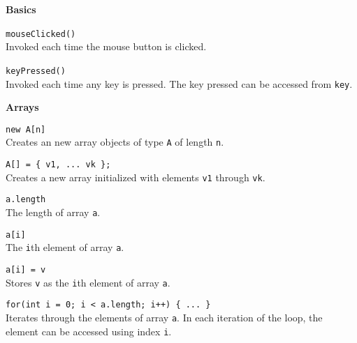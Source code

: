 \documentclass[10pt,twocolumn]{article}
\begin{document}
\thispagestyle{empty}


\noindent\textbf{\large Basics}

\begin{description}
\item{\texttt{mouseClicked()}}\ \\[.25em]
Invoked each time the mouse button is clicked.

\item{\texttt{keyPressed()}}\ \\[.25em] 
Invoked each time any key is pressed. The key pressed can be accessed
from \texttt{key}.
\end{description}

\bigskip

\noindent\textbf{\large Arrays}

\begin{description}
\item{\texttt{new A[n]}} \\[.25em]
Creates an new array objects of type \texttt{A} of length
\texttt{n}. 

\item{\texttt{A[] = \{ v1, ... vk \};}} \\[.25em] 
Creates a new array initialized with elements \texttt{v1} through \texttt{vk}. 


\item{\texttt{a.length}} \\[.25em]
The length of array \texttt{a}. 

\item{\texttt{a[i]}} \\[.25em]
The \texttt{i}th element of array \texttt{a}. 

\item{\texttt{a[i] = v}} \\[.25em]
Stores \texttt{v} as the \texttt{i}th element of array \texttt{a}. 

\item{\texttt{for(int i = 0; i < a.length; i++) \{ ... \}}} \\[.25em]
  Iterates through the elements of array \texttt{a}. In each iteration
  of the loop, the element can be accessed using index \texttt{i}.
\end{description}

\bigskip
\end{document}
